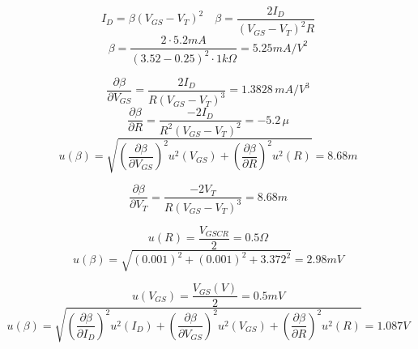 \[
I_D = \beta (V_{GS}-V_T)^2 \quad \beta = \frac{2I_D}{(V_{GS}-V_T)^2R}
\]
\[
\beta = \frac{2\cdot 5.2mA}{(3.52-0.25)^2\cdot 1k\Omega} = 5.25mA/V^2
\]

\[
\frac{\partial \beta}{\partial V_{GS}} = \frac{2I_D}{R(V_{GS}-V_T)^3} = 1.3828\,mA/V^3
\]
\[
\frac{\partial \beta}{\partial R} = \frac{-2I_D}{R^2(V_{GS}-V_T)^2} = -5.2\,\mu
\]
\[
u(\beta) = \sqrt{\left( \frac{\partial \beta}{\partial V_{GS}} \right)^2 u^2(V_{GS}) + \left( \frac{\partial \beta}{\partial R} \right)^2 u^2(R)} = 8.68m
\]

\[
\frac{\partial \beta}{\partial V_T} = \frac{-2V_T}{R(V_{GS}-V_T)^3} = 8.68m
\]

\[
u(R) = \frac{V_{GSCR}}{2} = 0.5\Omega
\]
\[
u(\beta) = \sqrt{(0.001)^2 + (0.001)^2 + 3.372^2} = 2.98mV
\]


\[
u(V_{GS}) = \frac{V_{GS}(V)}{2} = 0.5mV
\]
\[
u(\beta) = \sqrt{\left( \frac{\partial \beta}{\partial I_D} \right)^2 u^2(I_D) + 
\left( \frac{\partial \beta}{\partial V_{GS}} \right)^2 u^2(V_{GS}) +
\left( \frac{\partial \beta}{\partial R} \right)^2 u^2(R)} = 1.087V
\]